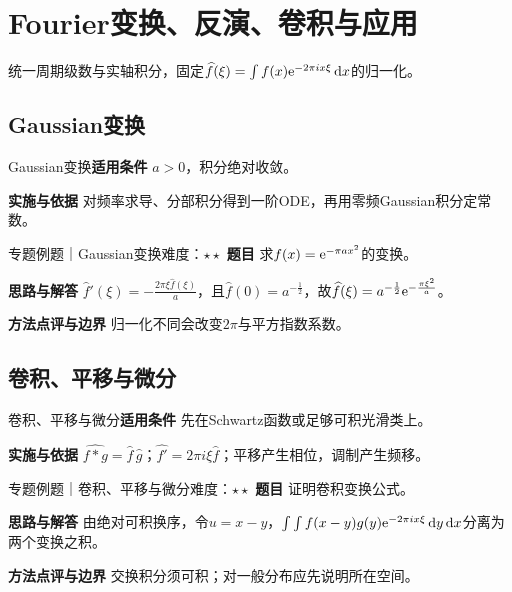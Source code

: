 \section{Fourier变换、反演、卷积与应用}\label{mat:fourier_transform}
\begin{examtip}统一周期级数与实轴积分，固定$\widehat f(\xi)=\int f(x)\mathrm{e}^{-2\pi i x\xi}\mathop{}\!\mathrm{d} x$的归一化。\end{examtip}
\subsection{Gaussian变换}\label{mat:fourier_transform:gaussian}
\begin{method}{Gaussian变换}\textbf{适用条件} $a>0$，积分绝对收敛。\par\textbf{实施与依据} 对频率求导、分部积分得到一阶ODE，再用零频Gaussian积分定常数。\end{method}
\begin{example}{专题例题｜Gaussian变换}{难度：$\star\star$}
\textbf{题目} 求$f(x)=\mathrm{e}^{-\pi a x^2}$的变换。\par\textbf{思路与解答} $\widehat f\prime(\xi)=-\frac{2\pi\xi\widehat f(\xi)}{a}$，且$\widehat f(0)=a^{-\frac{1}{2}}$，故$\widehat f(\xi)=a^{-\frac{1}{2}}\mathrm{e}^{-\frac{\pi\xi^2}{a}}$。\par\textbf{方法点评与边界} 归一化不同会改变$2\pi$与平方指数系数。
\end{example}
\subsection{卷积、平移与微分}\label{mat:fourier_transform:convolution}
\begin{method}{卷积、平移与微分}\textbf{适用条件} 先在Schwartz函数或足够可积光滑类上。\par\textbf{实施与依据} $\widehat{f*g}=\widehat f\,\widehat g$；$\widehat{f\prime}=2\pi i\xi\widehat f$；平移产生相位，调制产生频移。\end{method}
\begin{example}{专题例题｜卷积、平移与微分}{难度：$\star\star$}
\textbf{题目} 证明卷积变换公式。\par\textbf{思路与解答} 由绝对可积换序，令$u=x-y$，$\int\int f(x-y)g(y)\mathrm{e}^{-2\pi ix\xi}\mathop{}\!\mathrm{d} y\mathop{}\!\mathrm{d} x$分离为两个变换之积。\par\textbf{方法点评与边界} 交换积分须可积；对一般分布应先说明所在空间。
\end{example}

